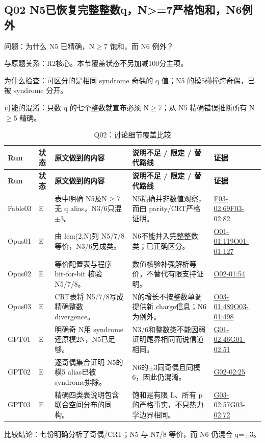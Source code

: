\documentclass[11pt,a4paper]{article}
\begin{document}
\clearpage
\subsection{Q02 N5已恢复完整整数q，N>=7严格饱和，N6例外}
\label{aspect:Q02}
问题：为什么 N5 已精确，N\ensuremath{\geq}7 饱和，而 N6 例外？

与原题关系：R2核心。本节覆盖状态不另加减100分主项。

为什么检查：可区分的是相同 syndrome 奇偶的 q 值；N5 的模5碰撞跨奇偶，已被 syndrome 分开。

可能的混淆：只数 q 的七个整数就宣布必须 N\ensuremath{\geq}7；从 N5 精确错误推断所有 N\ensuremath{\geq}5 精确。

{\fontsize{9.0}{12.6}\selectfont
\setlength{\tabcolsep}{2.5pt}
\begin{longtable}{>{\raggedright\arraybackslash}p{}>{\raggedright\arraybackslash}p{}>{\raggedright\arraybackslash}p{}>{\raggedright\arraybackslash}p{}>{\raggedright\arraybackslash}p{}}
\caption{Q02：讨论细节覆盖比较}\\
\toprule
\textbf{Run} & \textbf{状态} & \textbf{原文做到的内容} & \textbf{说明不足 / 限定 / 替代路线} & \textbf{证据}\tabularnewline
\midrule
\endfirsthead
\toprule
\textbf{Run} & \textbf{状态} & \textbf{原文做到的内容} & \textbf{说明不足 / 限定 / 替代路线} & \textbf{证据}\tabularnewline
\midrule
\endhead
{}Fable03 & E & 表中明确 N5及N\ensuremath{\geq}7无 q alias，N3/6只混\ensuremath{\pm}3。 & N5精确并非数值观察，而由 parity/CRT严格证明。 & \hyperref[src:F03-02]{F03-02:69}\newline \hyperref[src:F03-02]{F03-02:82}\tabularnewline
{}Opus01 & E & 由 lcm(2,N)列 N5/7/8等价，N3/6另成类。 & N6不能并入完整整数类；已正确区分。 & \hyperref[src:O01-01]{O01-01:119}\newline \hyperref[src:O01-01]{O01-01:127}\tabularnewline
{}Opus02 & E & 等价配置表与程序 bit-for-bit 核验 N5/7/8。 & 数值核验补强解析等价，不替代有限支持证明。 & \hyperref[src:O02-01]{O02-01:54}\tabularnewline
{}Opus03 & E & CRT表将 N5/7/8写成精确整数 divergence。 & N的增长不按整数单调提供新 charge信息；N6为例外。 & \hyperref[src:O03-01]{O03-01:489}\newline \hyperref[src:O03-01]{O03-01:498}\tabularnewline
{}GPT01 & E & 明确奇 N用 syndrome还原模2N，N5已足够。 & N3/6和整数类不能因弱证明尾界相同而说信道相同。 & \hyperref[src:G01-02]{G01-02:46}\newline \hyperref[src:G01-02]{G01-02:51}\tabularnewline
{}GPT02 & E & 逐奇偶集合证明 N5的模5 alias已被 syndrome排除。 & N6的\ensuremath{\pm}3同奇偶且同模6，因此仍混淆。 & \hyperref[src:G02-02]{G02-02:25}\tabularnewline
{}GPT03 & E & 精确四类表说明包含联合空间分布的同构。 & 饱和是有限 L、所有 p 的严格事实，不只热力学边界相同。 & \hyperref[src:G03-02]{G03-02:57}\newline \hyperref[src:G03-02]{G03-02:72}\tabularnewline
\bottomrule
\end{longtable}
}
比较结论：七份明确分析了奇偶/CRT；N5 与 N7/8 等价，而 N6 仍混合 q=\ensuremath{\pm}3。
\end{document}

